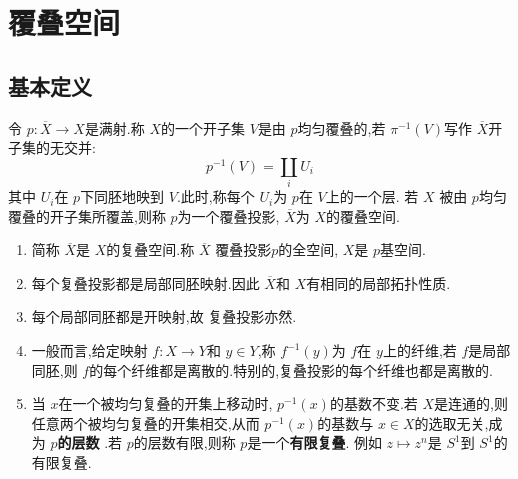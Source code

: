 \documentclass[../../几何与拓扑.tex]{subfiles}
\begin{document}
    
\chapter{覆叠空间}

\section{基本定义}

\begin{definition}
    令 \(  p: \overline{X}\to X  \)是满射.称 \(  X  \)的一个开子集 \(  V  \)是由 \(  p  \)均匀覆叠的,若 \(  \pi  ^{-1} \left( V \right) \)写作 \(  \overline{X}  \)开子集的无交并: \[
    p ^{-1} \left( V \right)=\coprod  _{i}U_{i}
    \]      其中 \(  U_{i}  \)在 \(  p  \)下同胚地映到 \(  V  \).此时,称每个 \(  U_{i}  \)为 \(  p  \)在 \(  V  \)上的一个层.  若 \(  X  \)  被由 \(  p  \)均匀覆叠的开子集所覆盖,则称 \(  p  \)为一个覆叠投影, \(  \overline{X}  \)为 \(  X  \)的覆叠空间. 
\end{definition}

\begin{remark}
    \begin{enumerate}
        \item 简称 \(  \overline{X}  \)是 \(  X  \)的复叠空间.称 \(  \overline{X}  \)  覆叠投影\(  p  \)的全空间, \(  X  \)是 \(  p  \)基空间.  
        \item 每个复叠投影都是局部同胚映射.因此 \(  \overline{X}  \)和 \(  X  \)有相同的局部拓扑性质.   
        \item 每个局部同胚都是开映射,故 复叠投影亦然.
        \item 一般而言,给定映射 \(  f:X\to Y  \)和 \(  y \in Y  \),称 \(  f^{-1} \left( y \right)   \)为 \(  f  \)在 \(  y  \)上的纤维,若 \(  f  \)是局部同胚,则 \(  f  \)的每个纤维都是离散的.特别的,复叠投影的每个纤维也都是离散的.
        \item   当 \(  x  \)在一个被均匀复叠的开集上移动时, \(  p ^{-1} \left( x \right)   \)的基数不变.若 \(  X  \)是连通的,则任意两个被均匀复叠的开集相交,从而 \(  p ^{-1} \left( x \right)   \)的基数与  \(  x\in X  \)的选取无关,成为 \textbf{\(  p  \)的层数 }.若 \(  p  \)的层数有限,则称 \(  p  \)是一个\textbf{有限复叠}.      例如 \(  z \mapsto z^{n}  \)是 \(  S^{1}  \)到 \(  S^{1}  \)的有限复叠.   
    \end{enumerate}
\end{remark}
\end{document}
